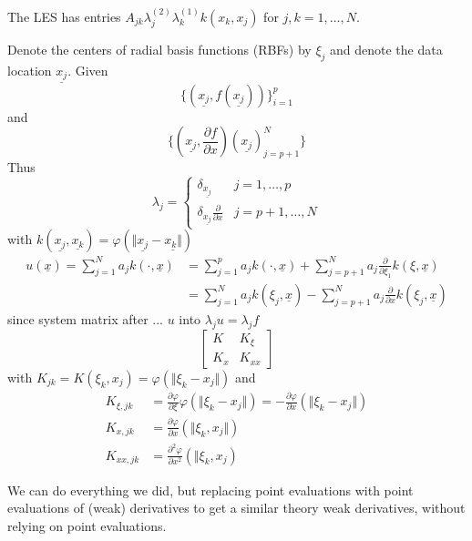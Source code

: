 The LES has entries $A_{jk}\lambda_j^{(2)}\lambda_k^{(1)}k(x_k,x_j)$ for $j,k=1,\dots,N$.

\begin{example}
    Denote the centers of radial basis functions (RBFs) by $\xi_j$ and denote the data location 
    $\underline{x_j}$. Given  \[\{(\underline{x_j},f(\underline{x_j}))\}_{i=1}^p\] 
    and 
    \[\{(\underline{x_j},\frac{\partial f}{\partial x})(\underline{x_j})_{j=p+1}^N\}\]
    Thus 
    \[\lambda_j = \begin{cases}
        \delta_{\underline{x_j}} & j=1,\dots,p\\
        \delta_{\underline{x_j}}\frac{\partial }{\partial x} & j=p+1,\dots,N
    \end{cases}\]
    with $k(\underline{x_j},\underline{x_k})=\varphi(\Vert \underline{x_j}-\underline{x_k\Vert})$
    \begin{eqnarray*}
        u(\underline{x})=\sum_{j=1}^N a_j k(\cdot, \underline{x})&=\sum_{j=1}^p a_j k(\cdot, \underline{x})+\sum_{j=p+1}^N a_j \frac{\partial}{\partial \xi_1} k(\xi,\underline{x})\\
        &=\sum_{j=1}^N a_jk(\xi_j,\underline{x})-\sum_{j=p+1}^N a_j \frac{\partial}{\partial x} k(\xi_j,\underline{x})
    \end{eqnarray*}
    since system matrix after ... $u$ into $\lambda_ju=\lambda_j f$
    \[\begin{bmatrix}
        K & K_\xi\\ K_x & K_{xx}
    \end{bmatrix}\]
    with $K_{jk}=K(\xi_k,x_j)=\varphi(\Vert \xi_k-x_j\Vert)$
    and 
    \begin{align*}
        K_{\xi,jk}&=\frac{\partial \varphi}{\partial \xi}\varphi(\Vert \xi_k-x_j\Vert) = -\frac{\partial \varphi}{\partial x}(\Vert \xi_k-x_j\Vert)\\
        K_{x,jk}&=\frac{\partial \varphi}{\partial x}(\Vert \xi_k,x_j\Vert) \\
        K_{xx,jk}&=\frac{\partial^2\varphi}{\partial x^2}(\Vert \xi_k,x_j)
    \end{align*}
\end{example}


\begin{aremark}
    We can do everything we did, but replacing point evaluations with point evaluations of
    (weak) derivatives to get a similar theory weak derivatives, without relying on point evaluations.
\end{aremark}

